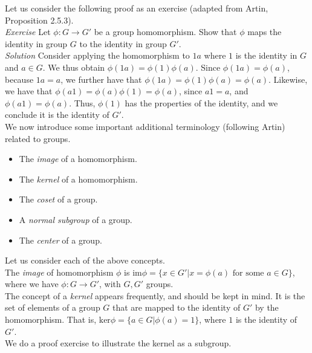 Let us consider the following proof as an exercise (adapted from Artin, Proposition 2.5.3).\\

\textit{Exercise} Let $\phi:G \rightarrow G'$ be a group homomorphism.  Show that $\phi$ maps the identity in group $G$ to the identity in group $G'.$\\

\textit{Solution}  Consider applying the homomorphism to $1a$ where $1$ is the identity in $G$ and $a \in G$.  We thus obtain $\phi(1a)=\phi(1)\phi(a).$  Since $\phi(1a)=\phi(a)$, because $1a=a$, we further have that $\phi(1a)=\phi(1)\phi(a)=\phi(a)$.  Likewise, we have that $\phi(a1)=\phi(a)\phi(1)=\phi(a)$, since $a1=a$, and $\phi(a1)=\phi(a).$  Thus, $\phi(1)$ has the properties of the identity, and we conclude it is the identity of $G'$.\\

We now introduce some important additional terminology (following Artin) related to groups.\\

\begin{itemize}
\item The \textit{image} of a homomorphism.
\item The \textit{kernel} of a homomorphism.
\item The \textit{coset} of a group.
\item A \textit{normal subgroup} of a group.
\item The \textit{center} of a group.
\end{itemize}

Let us consider each of the above concepts.\\

The \textit{image} of homomorphism $\phi$ is $\text{im} \phi = \{x \in G' | x=\phi(a) \text{ for some } a \in G \}$, where we have $\phi: G \rightarrow G'$, with $G,G'$ groups.\\

The concept of a \textit{kernel} appears frequently, and should be kept in mind.  It is the set of elements of a group $G$ that are mapped to the identity of $G'$ by the homomorphism.  That is, $\text{ker} \phi = \{a \in G | \phi(a) =1 \}$, where $1$ is the identity of $G'.$\\

We do a proof exercise to illustrate the kernel as a subgroup.\\

